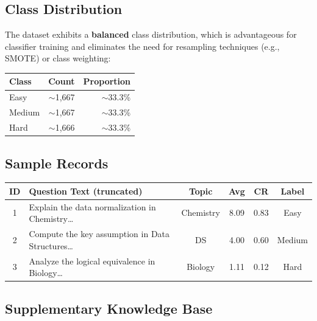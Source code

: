 \documentclass[12pt, a4paper, twoside]{article}
\begin{document}
\subsection{Class Distribution}

The dataset exhibits a \textbf{balanced} class distribution, which is
advantageous for classifier training and eliminates the need for
resampling techniques (e.g., SMOTE) or class weighting:

\begin{center}
\renewcommand{\arraystretch}{1.3}
\begin{tabular}{lrr}
    \toprule
    \textbf{Class} & \textbf{Count} & \textbf{Proportion} \\
    \midrule
    \textcolor{easygreen}{Easy}   & $\sim$1{,}667 & $\sim$33.3\% \\
    \textcolor{medamber}{Medium}  & $\sim$1{,}667 & $\sim$33.3\% \\
    \textcolor{hardred}{Hard}     & $\sim$1{,}666 & $\sim$33.3\% \\
    \bottomrule
\end{tabular}
\end{center}

\subsection{Sample Records}

\begin{center}
\renewcommand{\arraystretch}{1.2}
\small
\begin{tabularx}{\textwidth}{c X c c c c}
    \toprule
    \textbf{ID} & \textbf{Question Text (truncated)} & \textbf{Topic} &
    \textbf{Avg} & \textbf{CR} & \textbf{Label} \\
    \midrule
    1 & Explain the data normalization in Chemistry\ldots &
        Chemistry & 8.09 & 0.83 & Easy \\
    2 & Compute the key assumption in Data Structures\ldots &
        DS & 4.00 & 0.60 & Medium \\
    3 & Analyze the logical equivalence in Biology\ldots &
        Biology & 1.11 & 0.12 & Hard \\
    \bottomrule
\end{tabularx}
\end{center}

\subsection{Supplementary Knowledge Base}
\end{document}
